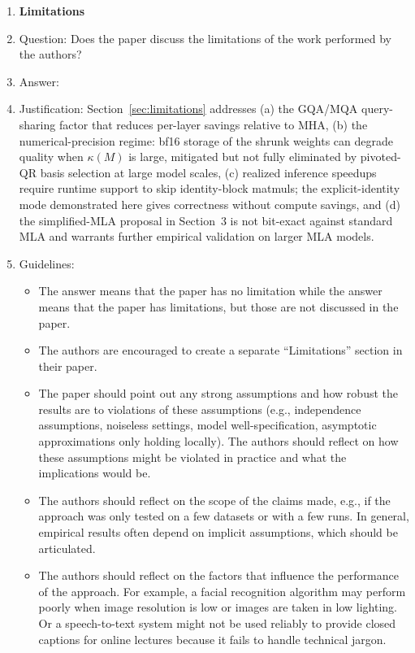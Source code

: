\begin{enumerate}
\item {\bf Limitations}
    \item[] Question: Does the paper discuss the limitations of the work performed by the authors?
    \item[] Answer: \answerYes{} %
    \item[] Justification: Section~\ref{sec:limitations} addresses (a) the GQA/MQA query-sharing factor that reduces per-layer savings relative to MHA, (b) the numerical-precision regime: bf16 storage of the shrunk weights can degrade quality when $\kappa(M)$ is large, mitigated but not fully eliminated by pivoted-QR basis selection at large model scales, (c) realized inference speedups require runtime support to skip identity-block matmuls; the explicit-identity mode demonstrated here gives correctness without compute savings, and (d) the simplified-MLA proposal in Section~3 is not bit-exact against standard MLA and warrants further empirical validation on larger MLA models.
    \item[] Guidelines:
    \begin{itemize}
        \item The answer \answerNA{} means that the paper has no limitation while the answer \answerNo{} means that the paper has limitations, but those are not discussed in the paper.
        \item The authors are encouraged to create a separate ``Limitations'' section in their paper.
        \item The paper should point out any strong assumptions and how robust the results are to violations of these assumptions (e.g., independence assumptions, noiseless settings, model well-specification, asymptotic approximations only holding locally). The authors should reflect on how these assumptions might be violated in practice and what the implications would be.
        \item The authors should reflect on the scope of the claims made, e.g., if the approach was only tested on a few datasets or with a few runs. In general, empirical results often depend on implicit assumptions, which should be articulated.
        \item The authors should reflect on the factors that influence the performance of the approach. For example, a facial recognition algorithm may perform poorly when image resolution is low or images are taken in low lighting. Or a speech-to-text system might not be used reliably to provide closed captions for online lectures because it fails to handle technical jargon.

\end{itemize}
\end{enumerate}
